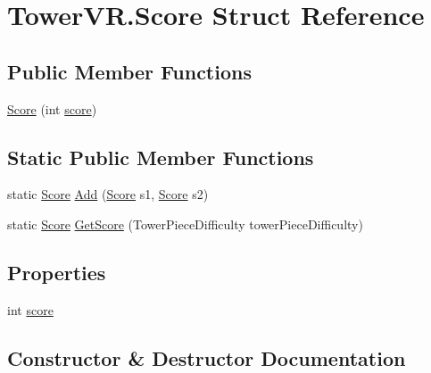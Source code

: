\hypertarget{struct_tower_v_r_1_1_score}{}\section{Tower\+V\+R.\+Score Struct Reference}
\label{struct_tower_v_r_1_1_score}
\subsection*{Public Member Functions}
\begin{DoxyCompactItemize}
\item 
\hyperlink{struct_tower_v_r_1_1_score_afecfe2d8892f0b5c0dce93d4fd4e2356}{Score} (int \hyperlink{struct_tower_v_r_1_1_score_a0c15824361f37b888d650812d162970d}{score})
\end{DoxyCompactItemize}
\subsection*{Static Public Member Functions}
\begin{DoxyCompactItemize}
\item 
static \hyperlink{struct_tower_v_r_1_1_score}{Score} \hyperlink{struct_tower_v_r_1_1_score_aac623a0d5853cf71f1599cdc7dd2f963}{Add} (\hyperlink{struct_tower_v_r_1_1_score}{Score} s1, \hyperlink{struct_tower_v_r_1_1_score}{Score} s2)
\item 
static \hyperlink{struct_tower_v_r_1_1_score}{Score} \hyperlink{struct_tower_v_r_1_1_score_af6094076da2c9cbdab969bf879e4dfcd}{Get\+Score} (Tower\+Piece\+Difficulty tower\+Piece\+Difficulty)
\end{DoxyCompactItemize}
\subsection*{Properties}
\begin{DoxyCompactItemize}
\item 
int \hyperlink{struct_tower_v_r_1_1_score_a0c15824361f37b888d650812d162970d}{score}
\end{DoxyCompactItemize}


\subsection{Constructor \& Destructor Documentation}
